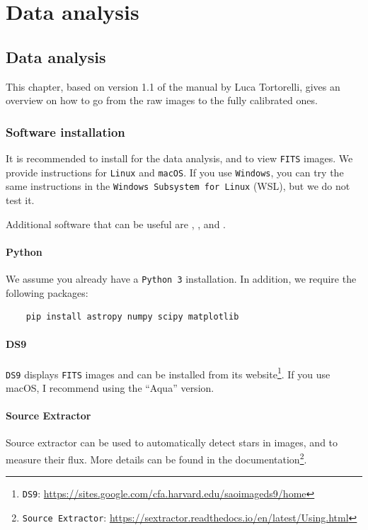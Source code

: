 \documentclass[a4paper, 11pt, fleqn]{memoir}
\begin{document}
\part{Data analysis}

\chapter{Data analysis}

This chapter, based on version 1.1 of the manual by Luca Tortorelli\autocite{Tortorelli2015_DataReduction}, gives an overview on how to go from the raw images to the fully calibrated ones.

\section{Software installation}
It is recommended to install  for the data analysis, and  to view \texttt{FITS} images.
We provide instructions for \texttt{Linux} and \texttt{macOS}.
If you use \texttt{Windows}, you can try the same instructions in the \texttt{Windows Subsystem for Linux} (WSL), but we do not test it.


Additional software that can be useful are , , and .

\subsection{Python}
We assume you already have a \texttt{Python 3} installation. In addition, we require the following packages:
\begin{verbatim}
    pip install astropy numpy scipy matplotlib
\end{verbatim}


\subsection{DS9}

\texttt{DS9} displays \texttt{FITS} images and can be installed from its website\footnote{\texttt{DS9}: \url{https://sites.google.com/cfa.harvard.edu/saoimageds9/home}}.
If you use macOS, I recommend using the \enquote{Aqua} version.

\subsection{Source Extractor}

Source extractor can be used to automatically detect stars in images, and to measure their flux.
More details can be found in the documentation\footnote{\texttt{Source Extractor}: \url{https://sextractor.readthedocs.io/en/latest/Using.html}}.
\end{document}
